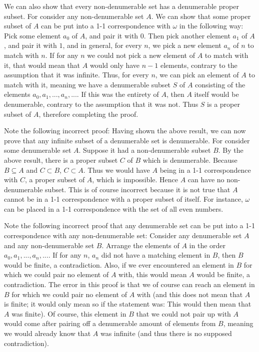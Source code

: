 \documentclass{article}
\theoremstyle{definition}
\begin{document}
We can also show that every non-denumerable set has a denumerable proper subset. For consider any non-denumerable set $A$. We can show that some proper subset of $A$ can 
be put into a 1-1 correspondence with $\omega$ in the following way: Pick some element $a_0$ of $A$, and pair it with 0. Then pick another element $a_1$ of $A$, and 
pair it with $1$, and in general, for every $n$, we pick a new element $a_n$ of $n$ to match with $n$. 
If for any $n$ we could not pick a new element of $A$ to match with it, that would mean that $A$ would only have $n-1$ elements, contrary to the 
assumption that it was infinite. Thus, for every $n$, we can pick an element of $A$ to match with it, meaning we have a denumerable subset $S$ of $A$ consisting of the 
elements 
$a_0,a_1,...,a_n,...$. If this was the entirety of $A$, then $A$ itself would be denumerable, contrary to the assumption that it was not. Thus $S$ is a 
proper subset of $A$, therefore completing the proof.


Note the following incorrect proof: Having shown the above result, we can now prove that any infinite subset of a denumerable set is denumerable. For consider some denumerable set $A$. Suppose it had a 
non-denumerable subset $B$. By the above result, there is a proper subset $C$ of $B$ which is denumerable. Because $B\subseteq A$ and $C\subset B$, $C\subset A$. Thus we 
would have $A$ being in a 1-1 correspondence with $C$, a proper subset of $A$, which is impossible. Hence $A$ can have no non-denumerable subset. This is of course incorrect because it is not 
true that $A$ cannot be in a 1-1 correspondence with a proper subset of itself. For instance, $\omega$ can be placed in a 1-1 correspondence with the set of all even numbers.


Note the following incorrect proof that any denumerable set can be put into a 1-1 correspondence with any non-denumerable set: Consider any denumerable set $A$ and any
non-denumerable set $B$. Arrange the elements of $A$ in the order $a_0,a_1,...,a_n,...$. If for any $n$, $a_n$ did not have a matching element in $B$, then 
$B$ would be finite, a contradiction. Also, if we ever encountered an element in $B$ for which we could pair no element of $A$ with, this would mean $A$ would be finite, 
a contradiction. The error in this proof is that we of course can reach an element in $B$ for which we could pair no element of $A$ with (and this does not mean that $A$ is 
finite; it would only mean so if the statement was: This 
would then mean that $A$ was finite). Of course, this element in $B$ that we could not pair up with $A$ would come after pairing off a denumerable amount of elements from 
$B$, meaning we would already know that $A$ was infinite (and thus there is no supposed contradiction). 
\end{document}
